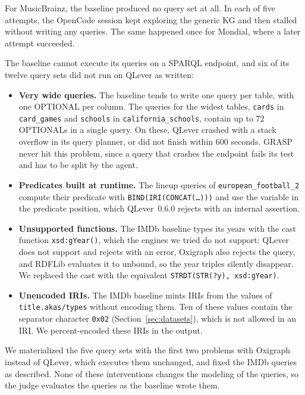 For MusicBrainz, the baseline produced no query set at all. In each of five attempts, the OpenCode session kept exploring the generic KG and then stalled without writing any queries. The same happened once for Mondial, where a later attempt succeeded.

The baseline cannot execute its queries on a SPARQL endpoint, and six of its twelve query sets did not run on QLever as written:
\begin{itemize}[leftmargin=*, itemsep=2pt]
  \item \textbf{Very wide queries.} The baseline tends to write one query per table, with one OPTIONAL per column. The queries for the widest tables, \texttt{cards} in \texttt{card\_games} and \texttt{schools} in \texttt{california\_schools}, contain up to 72 OPTIONALs in a single query. On these, QLever crashed with a stack overflow in its query planner, or did not finish within 600 seconds. GRASP never hit this problem, since a query that crashes the endpoint fails its test and has to be split by the agent.
  \item \textbf{Predicates built at runtime.} The lineup queries of \texttt{european\_football\_2}  compute their predicate with \texttt{BIND(IRI(CONCAT(\ldots)))} and use the variable in the predicate position, which QLever~0.6.0 rejects with an internal assertion.
  \item \textbf{Unsupported functions.} The IMDb baseline types its years with the cast function \texttt{xsd:gYear()}, which the engines we tried do not support: QLever does not support and rejects with an error, Oxigraph also rejects the query, and RDFLib evaluates it to unbound, so the year triples silently disappear. We replaced the cast with the equivalent \texttt{STRDT(STR(?y), xsd:gYear)}.
  \item \textbf{Unencoded IRIs.} The IMDb baseline mints IRIs from the values of \texttt{title.akas/types} without encoding them. Ten of these values contain the separator character \texttt{0x02} (Section~\ref{sec:datasets}), which is not allowed in an IRI\@. We percent-encoded these IRIs in the output.
\end{itemize}
We materialized the five query sets with the first two problems with Oxigraph instead of QLever, which executes them unchanged, and fixed the IMDb queries as described. None of these interventions changes the modeling of the queries, so the judge evaluates the queries as the baseline wrote them. 

